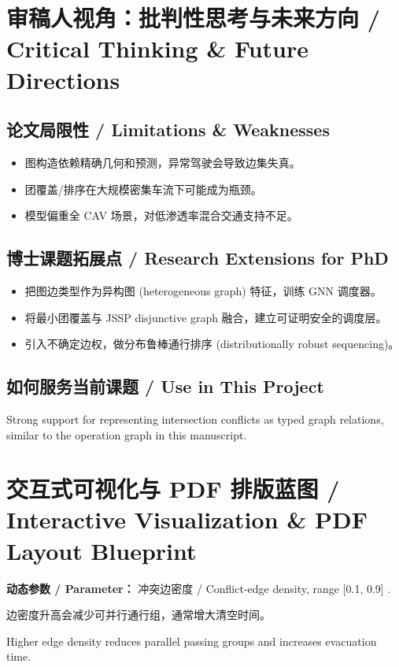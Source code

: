 \documentclass[UTF8,a4paper,11pt,fontset=fandol]{ctexart}
\begin{document}
\section{审稿人视角：批判性思考与未来方向 / Critical Thinking \& Future Directions}
\subsection{论文局限性 / Limitations \& Weaknesses}
\begin{itemize}
\item 图构造依赖精确几何和预测，异常驾驶会导致边集失真。
\item 团覆盖/排序在大规模密集车流下可能成为瓶颈。
\item 模型偏重全 CAV 场景，对低渗透率混合交通支持不足。
\end{itemize}


\subsection{博士课题拓展点 / Research Extensions for PhD}
\begin{itemize}
\item 把图边类型作为异构图 (heterogeneous graph) 特征，训练 GNN 调度器。
\item 将最小团覆盖与 JSSP disjunctive graph 融合，建立可证明安全的调度层。
\item 引入不确定边权，做分布鲁棒通行排序 (distributionally robust sequencing)。
\end{itemize}


\subsection{如何服务当前课题 / Use in This Project}
Strong support for representing intersection conflicts as typed graph relations, similar to the operation graph in this manuscript.

\section{交互式可视化与 PDF 排版蓝图 / Interactive Visualization \& PDF Layout Blueprint}
\textbf{动态参数 / Parameter：} 冲突边密度 / Conflict-edge density, range [0.1, 0.9] .

边密度升高会减少可并行通行组，通常增大清空时间。

Higher edge density reduces parallel passing groups and increases evacuation time.
\end{document}
